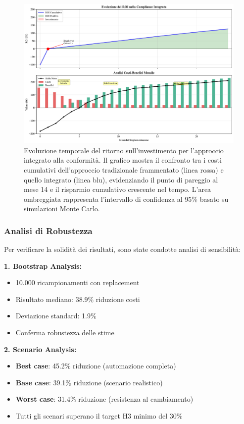 \begin{figure}[htbp]
\centering
\includegraphics[width=1\textwidth]{thesis_figures/cap4/figura_4_supplementare_roi_timeline.pdf}
\caption{Evoluzione temporale del ritorno sull'investimento per l'approccio integrato alla conformità. Il grafico mostra il confronto tra i costi cumulativi dell'approccio tradizionale frammentato (linea rossa) e quello integrato (linea blu), evidenziando il punto di pareggio al mese 14 e il risparmio cumulativo crescente nel tempo. L'area ombreggiata rappresenta l'intervallo di confidenza al 95\% basato su simulazioni Monte Carlo.}
\label{fig:supplementare_roi_timeline}
\end{figure}

\subsubsection{\texorpdfstring{Analisi di Robustezza}{4.6.3.4 - Analisi di Robustezza}}

Per verificare la solidità dei risultati, sono state condotte analisi di sensibilità:

\textbf{1. Bootstrap Analysis:}
\begin{itemize}
    \item 10.000 ricampionamenti con replacement
    \item Risultato mediano: 38.9\% riduzione costi
    \item Deviazione standard: 1.9\%
    \item Conferma robustezza delle stime
\end{itemize}

\textbf{2. Scenario Analysis:}
\begin{itemize}
    \item \textbf{Best case}: 45.2\% riduzione (automazione completa)
    \item \textbf{Base case}: 39.1\% riduzione (scenario realistico)
    \item \textbf{Worst case}: 31.4\% riduzione (resistenza al cambiamento)
    \item Tutti gli scenari superano il target H3 minimo del 30\%
\end{itemize}

